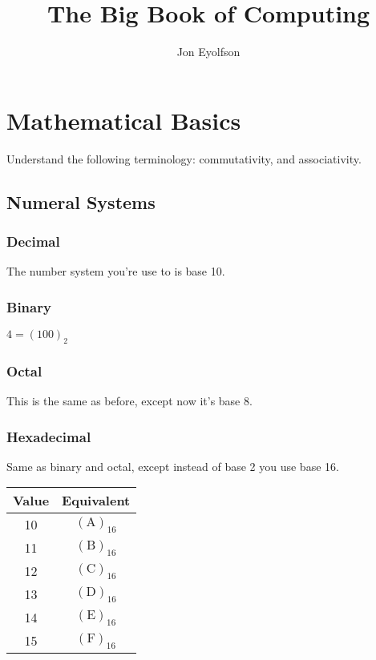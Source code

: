 \documentclass[12pt]{book}
\title{The Big Book of Computing}
\author{Jon Eyolfson}
\begin{document}
  \maketitle

  \tableofcontents

  \chapter{Mathematical Basics}

  Understand the following terminology: commutativity, and associativity.

  \section{Numeral Systems}

  \subsection{Decimal}

  The number system you're use to is base 10.

  \subsection{Binary}

  $4 = (100)_2$

  \subsection{Octal}

  This is the same as before, except now it's base 8.

  \subsection{Hexadecimal}

  Same as binary and octal, except instead of base 2 you use base 16.

  \begin{tabular}{c c}
    \hline
    Value & Equivalent \\
    \hline
    10 & $(\text{A})_{16}$ \\
    11 & $(\text{B})_{16}$ \\
    12 & $(\text{C})_{16}$ \\
    13 & $(\text{D})_{16}$ \\
    14 & $(\text{E})_{16}$ \\
    15 & $(\text{F})_{16}$ \\
  \end{tabular}
\end{document}
